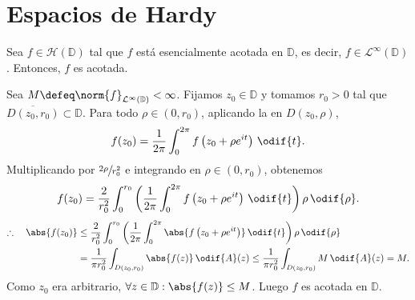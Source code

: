\chapter{Espacios de Hardy}



\begin{prop}\label{prop:fn-holomorfa-esencialmente-acotada-imp-acotada}
    Sea $f \in \mathcal{H}\left(\mathbb{D}\right)$ tal que $f$ está esencialmente acotada en $\mathbb{D}$, es decir, $f \in \mathcal{L}^{\infty} \left(\mathbb{D} \right)$. Entonces, $f$ es acotada.
\end{prop}
\begin{dem}
    Sea $M \defeq \norm{f}_{\mathcal{L}^{\infty}(\mathbb{D})} < \infty$. Fijamos $z_0 \in \mathbb{D}$ y tomamos $r_0 > 0$ tal que $\overline{D(z_0,r_0)} \subset \mathbb{D}$. Para todo $\rho \in (0,r_0)$, aplicando la  en $D(z_0,\rho)$,
    \[
    f(z_0) = \frac{1}{2\pi} \int_0^{2\pi} f\left(z_0+\rho e^{it}\right) \, \odif{t}.
    \]
    Multiplicando por $\sfrac{2\rho}{r_0^2}$ e integrando en $\rho \in (0,r_0)$, obtenemos
    \[
    f(z_0) = \frac{2}{r_0^2} \int_0^{r_0} \left(\frac{1}{2\pi} \int_0^{2\pi} f\left(z_0+\rho e^{it}\right) \, \odif{t}\right) \rho \, \odif{\rho}.
    \]
    \[
    \begin{aligned}
        \therefore \quad\abs{f(z_0)} &\leq \frac{2}{r_0^2} \int_0^{r_0} \left(\frac{1}{2\pi} \int_0^{2\pi} \abs{f\left(z_0+\rho e^{it}\right)} \, \odif{t}\right) \rho \, \odif{\rho} \\
        &= \frac{1}{\pi r_0^2} \int_{D(z_0,r_0)} \abs{f(z)} \, \odif{A}(z) \leq \frac{1}{\pi r_0^2} \int_{D(z_0,r_0)} M \, \odif{A}(z) = M.
    \end{aligned}
    \]
    Como $z_0$ era arbitrario, $\forall z \in \mathbb{D} : \abs{f(z)} \leq M$. Luego $f$ es acotada en $\mathbb{D}$.
\end{dem}